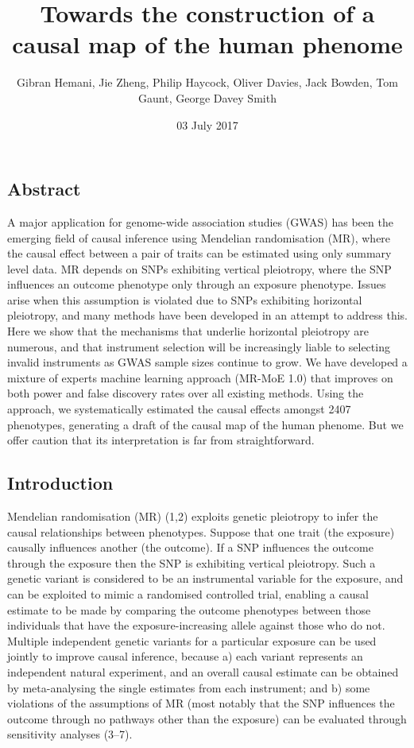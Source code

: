 \documentclass[]{article}
\title{Towards the construction of a causal map of the human phenome}
\author{Gibran Hemani, Jie Zheng, Philip Haycock, Oliver Davies, Jack Bowden,
Tom Gaunt, George Davey Smith}
\date{03 July 2017}
\begin{document}
\maketitle

\subsection{Abstract}\label{abstract}

A major application for genome-wide association studies (GWAS) has been
the emerging field of causal inference using Mendelian randomisation
(MR), where the causal effect between a pair of traits can be estimated
using only summary level data. MR depends on SNPs exhibiting vertical
pleiotropy, where the SNP influences an outcome phenotype only through
an exposure phenotype. Issues arise when this assumption is violated due
to SNPs exhibiting horizontal pleiotropy, and many methods have been
developed in an attempt to address this. Here we show that the
mechanisms that underlie horizontal pleiotropy are numerous, and that
instrument selection will be increasingly liable to selecting invalid
instruments as GWAS sample sizes continue to grow. We have developed a
mixture of experts machine learning approach (MR-MoE 1.0) that improves
on both power and false discovery rates over all existing methods. Using
the approach, we systematically estimated the causal effects amongst
2407 phenotypes, generating a draft of the causal map of the human
phenome. But we offer caution that its interpretation is far from
straightforward.

\subsection{Introduction}\label{introduction}

Mendelian randomisation (MR) (1,2) exploits genetic pleiotropy to infer
the causal relationships between phenotypes. Suppose that one trait (the
exposure) causally influences another (the outcome). If a SNP influences
the outcome through the exposure then the SNP is exhibiting vertical
pleiotropy. Such a genetic variant is considered to be an instrumental
variable for the exposure, and can be exploited to mimic a randomised
controlled trial, enabling a causal estimate to be made by comparing the
outcome phenotypes between those individuals that have the
exposure-increasing allele against those who do not. Multiple
independent genetic variants for a particular exposure can be used
jointly to improve causal inference, because a) each variant represents
an independent natural experiment, and an overall causal estimate can be
obtained by meta-analysing the single estimates from each instrument;
and b) some violations of the assumptions of MR (most notably that the
SNP influences the outcome through no pathways other than the exposure)
can be evaluated through sensitivity analyses (3--7).
\end{document}
